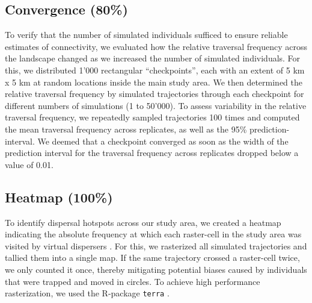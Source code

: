\documentclass[abstract=on,10pt,a4paper,bibliography=totocnumbered]{article}
\begin{document}
\subsection{Convergence (80\%)}
To verify that the number of simulated individuals sufficed to ensure reliable
estimates of connectivity, we evaluated how the relative traversal frequency
across the landscape changed as we increased the number of simulated
individuals. For this, we distributed 1'000 rectangular ``checkpoints'', each
with an extent of 5 km x 5 km at random locations inside the main study area. We
then determined the relative traversal frequency by simulated trajectories
through each checkpoint for different numbers of simulations (1 to 50'000). To
assess variability in the relative traversal frequency, we repeatedly sampled
trajectories 100 times and computed the mean traversal frequency across
replicates, as well as the 95\% prediction-interval. We deemed that a checkpoint
converged as soon as the width of the prediction interval for the traversal
frequency across replicates dropped below a value of 0.01.

\subsection{Heatmap (100\%)}
To identify dispersal hotspots across our study area, we created a heatmap
indicating the absolute frequency at which each raster-cell in the study area
was visited by virtual dispersers \citep{Hauenstein.2019, Peer.2008}. For this,
we rasterized all simulated trajectories and tallied them into a single map. If
the same trajectory crossed a raster-cell twice, we only counted it once,
thereby mitigating potential biases caused by individuals that were trapped and
moved in circles. To achieve high performance rasterization, we used the
R-package {\tt terra} \citep{Hijmans.2021}.
\end{document}
